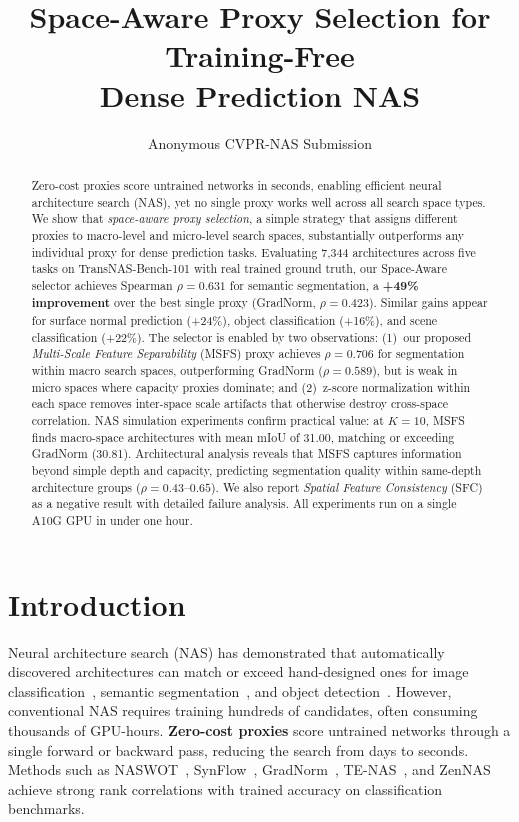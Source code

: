 \documentclass[10pt,twocolumn,letterpaper]{article}
\title{Space-Aware Proxy Selection for Training-Free\\Dense Prediction NAS}
\author{Anonymous CVPR-NAS Submission}
\newcommand{\sfc}{\textsc{SFC}}
\newcommand{\msfs}{\textsc{MSFS}}
\begin{document}
\maketitle

\begin{abstract}
Zero-cost proxies score untrained networks in seconds, enabling efficient neural architecture search (NAS), yet no single proxy works well across all search space types.
We show that \emph{space-aware proxy selection}, a simple strategy that assigns different proxies to macro-level and micro-level search spaces, substantially outperforms any individual proxy for dense prediction tasks.
Evaluating 7{,}344 architectures across five tasks on TransNAS-Bench-101 with real trained ground truth, our Space-Aware selector achieves Spearman $\rho{=}0.631$ for semantic segmentation, a \textbf{+49\% improvement} over the best single proxy (GradNorm, $\rho{=}0.423$).
Similar gains appear for surface normal prediction (+24\%), object classification (+16\%), and scene classification (+22\%).
The selector is enabled by two observations: (1)~our proposed \emph{Multi-Scale Feature Separability} (\msfs{}) proxy achieves $\rho{=}0.706$ for segmentation within macro search spaces, outperforming GradNorm ($\rho{=}0.589$), but is weak in micro spaces where capacity proxies dominate; and (2)~z-score normalization within each space removes inter-space scale artifacts that otherwise destroy cross-space correlation.
NAS simulation experiments confirm practical value: at $K{=}10$, \msfs{} finds macro-space architectures with mean mIoU of 31.00, matching or exceeding GradNorm (30.81).
Architectural analysis reveals that \msfs{} captures information beyond simple depth and capacity, predicting segmentation quality within same-depth architecture groups ($\rho{=}0.43$--$0.65$).
We also report \emph{Spatial Feature Consistency} (\sfc{}) as a negative result with detailed failure analysis.
All experiments run on a single A10G GPU in under one hour.
\end{abstract}

\section{Introduction}

Neural architecture search (NAS) has demonstrated that automatically discovered architectures can match or exceed hand-designed ones for image classification~\cite{dong2020nasbench201}, semantic segmentation~\cite{liu2019autodeeplab,chen2020fasterseg}, and object detection~\cite{ghiasi2019nasfpn,chen2019detnas,du2020spinenet}.
However, conventional NAS requires training hundreds of candidates, often consuming thousands of GPU-hours.
\textbf{Zero-cost proxies} score untrained networks through a single forward or backward pass, reducing the search from days to seconds.
Methods such as NASWOT~\cite{mellor2021naswot}, SynFlow~\cite{tanaka2020synflow}, GradNorm~\cite{abdelfattah2021zerocost}, TE-NAS~\cite{chen2021tenas}, and ZenNAS~\cite{lin2021zennas} achieve strong rank correlations with trained accuracy on classification benchmarks.
\end{document}
